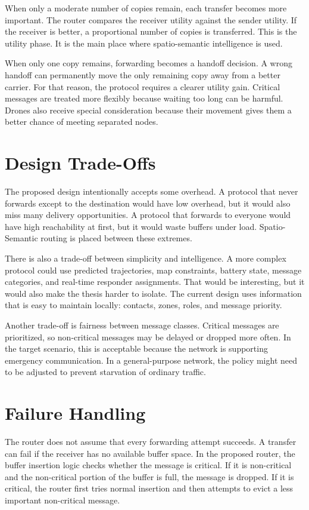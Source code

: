 When only a moderate number of copies remain, each transfer becomes more important. The router compares the receiver utility against the sender utility. If the receiver is better, a proportional number of copies is transferred. This is the utility phase. It is the main place where spatio-semantic intelligence is used.

When only one copy remains, forwarding becomes a handoff decision. A wrong handoff can permanently move the only remaining copy away from a better carrier. For that reason, the protocol requires a clearer utility gain. Critical messages are treated more flexibly because waiting too long can be harmful. Drones also receive special consideration because their movement gives them a better chance of meeting separated nodes.

\section{Design Trade-Offs}
The proposed design intentionally accepts some overhead. A protocol that never forwards except to the destination would have low overhead, but it would also miss many delivery opportunities. A protocol that forwards to everyone would have high reachability at first, but it would waste buffers under load. Spatio-Semantic routing is placed between these extremes.

There is also a trade-off between simplicity and intelligence. A more complex protocol could use predicted trajectories, map constraints, battery state, message categories, and real-time responder assignments. That would be interesting, but it would also make the thesis harder to isolate. The current design uses information that is easy to maintain locally: contacts, zones, roles, and message priority.

Another trade-off is fairness between message classes. Critical messages are prioritized, so non-critical messages may be delayed or dropped more often. In the target scenario, this is acceptable because the network is supporting emergency communication. In a general-purpose network, the policy might need to be adjusted to prevent starvation of ordinary traffic.

\section{Failure Handling}
The router does not assume that every forwarding attempt succeeds. A transfer can fail if the receiver has no available buffer space. In the proposed router, the buffer insertion logic checks whether the message is critical. If it is non-critical and the non-critical portion of the buffer is full, the message is dropped. If it is critical, the router first tries normal insertion and then attempts to evict a less important non-critical message.

